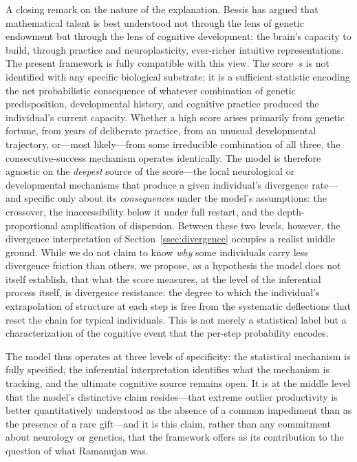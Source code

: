 \documentclass{article}
\begin{document}
A closing remark on the nature of the explanation. Bessis \cite{bessis2024mathematica,bessis2025genes,bessis2026jaimungal} has argued that mathematical talent is best understood not through the lens of genetic endowment but through the lens of cognitive development: the brain's capacity to build, through practice and neuroplasticity, ever-richer intuitive representations. The present framework is fully compatible with this view. The score~$s$ is not identified with any specific biological substrate; it is a sufficient statistic encoding the net probabilistic consequence of whatever combination of genetic predisposition, developmental history, and cognitive practice produced the individual's current capacity. Whether a high score arises primarily from genetic fortune, from years of deliberate practice, from an unusual developmental trajectory, or---most likely---from some irreducible combination of all three, the consecutive-success mechanism operates identically. The model is therefore agnostic on the \emph{deepest} source of the score---the local neurological or developmental mechanisms that produce a given individual's divergence rate---and specific only about its \emph{consequences} under the model's assumptions: the crossover, the inaccessibility below it under full restart, and the depth-proportional amplification of dispersion. Between these two levels, however, the divergence interpretation of Section~\ref{ssec:divergence} occupies a realist middle ground. While we do not claim to know \emph{why} some individuals carry less divergence friction than others, we propose, as a hypothesis the model does not itself establish, that what the score measures, at the level of the inferential process itself, is divergence resistance: the degree to which the individual's extrapolation of structure at each step is free from the systematic deflections that reset the chain for typical individuals. This is not merely a statistical label but a characterization of the cognitive event that the per-step probability encodes.

The model thus operates at three levels of specificity: the statistical mechanism is fully specified, the inferential interpretation identifies what the mechanism is tracking, and the ultimate cognitive source remains open. It is at the middle level that the model's distinctive claim resides---that extreme outlier productivity is better quantitatively understood as the absence of a common impediment than as the presence of a rare gift---and it is this claim, rather than any commitment about neurology or genetics, that the framework offers as its contribution to the question of what Ramanujan was.
\end{document}
